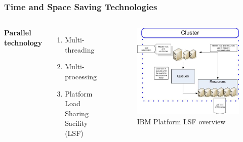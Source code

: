 \documentclass{beamer}
\begin{document}
\begin{frame}
  \frametitle{Time and Space Saving Technologies}
  \begin{columns}[c] %

    \textbf{Parallel technology}
    \begin{enumerate}
    \item Multi-threading
    \item Multi-processing
    \item Platform Load Sharing Sacility (LSF)
    \end{enumerate}

    \begin{figure}
      \centering
      \includegraphics[width=\linewidth]{lsf_cluster_overview}
      \caption{IBM Platform LSF overview}
    \end{figure}

  \end{columns}
\end{frame}

\end{document}
